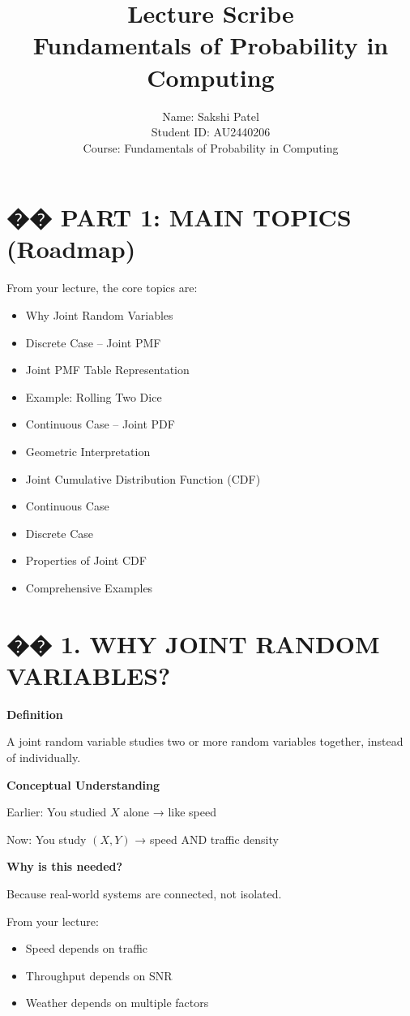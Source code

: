 \documentclass[12pt]{article}
\title{\textbf{Lecture Scribe}\\Fundamentals of Probability in Computing}
\author{
Name: Sakshi Patel\\
Student ID: AU2440206\\
Course: Fundamentals of Probability in Computing\\
}
\begin{document}
\maketitle

\section*{�� PART 1: MAIN TOPICS (Roadmap)}

From your lecture, the core topics are:
\begin{itemize}
\item Why Joint Random Variables
\item Discrete Case – Joint PMF
\item Joint PMF Table Representation
\item Example: Rolling Two Dice
\item Continuous Case – Joint PDF
\item Geometric Interpretation
\item Joint Cumulative Distribution Function (CDF)
\item Continuous Case
\item Discrete Case
\item Properties of Joint CDF
\item Comprehensive Examples
\end{itemize}

\section*{�� 1. WHY JOINT RANDOM VARIABLES?}

\textbf{Definition}

A joint random variable studies two or more random variables together, instead of individually.

\textbf{Conceptual Understanding}

Earlier: You studied $X$ alone → like speed

Now: You study $(X, Y)$ → speed AND traffic density

\textbf{Why is this needed?}

Because real-world systems are connected, not isolated.

From your lecture:
\begin{itemize}
\item Speed depends on traffic
\item Throughput depends on SNR
\item Weather depends on multiple factors
\end{itemize}
\end{document}
